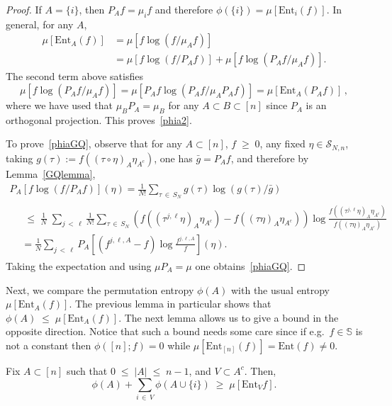 \documentclass[AHL,Unicode,longabstracts,published]{cedram}
\renewcommand{\leq}{\;\leqslant\;}
\renewcommand{\geq}{\;\geqslant\;}
\newcommand{\ent}{\mathrm{Ent}}
\newcommand{\cS}{\mathcal{S}}
\newcommand{\bbS}{\mathbb{S}}
\let\t=\tau
\begin{document}
\begin{proof}
If $A=\{i\}$, then $P_A f = \mu_i f$ and therefore $\phi(\{i\}) = \mu\left[\ent_i(f)\right]$. In general, for any $A$,
\begin{align*}
\mu\left[\ent_A(f) \right]&= \mu\left[f\log(f/\mu_Af)\right] \\
& =\mu\left[f\log(f/P_Af)\right] + \mu\left[f\log(P_Af/\mu_Af)\right].
\end{align*}
The second term above satisfies
\[
\mu\left[f\log(P_Af/\mu_Af)\right]= \mu\left[P_A f\log(P_Af/\mu_A P_Af)\right] = \mu\left[\ent_A(P_Af) \right] \,,
\]
where we have used that $\mu_BP_A=\mu_B$ for any $A\subset B\subset[n]$ since $P_A$ is an orthogonal projection. This proves~\eqref{phia2}.

To prove~\eqref{phiaGQ}, observe that for any $A\subset [n]$, $f\geq 0$, any fixed $\eta\in\cS_{N,n}$, taking $g(\t):=f((\t\circ\eta)_A\eta_{A^c})$, one has $\bar g = P_Af$, and therefore by Lemma~\ref{GQlemma},
\begin{multline*}
P_A\left[f\log(f/P_Af)\right] (\eta)=\frac1{N!}\sum_{\t\,\in\,S_N} g(\t)\log(g(\t)/\bar g)\\
\begin{aligned}
&\leq \frac1N\;\sum_{j\,<\,\ell}\frac1{N!}\sum_{\t\,\in\,S_N}\left(f\left((\t^{j,\ell}\eta)_A\eta_{A^c}\right) - f\left((\t\eta)_A\eta_{A^c}\right)\right)\log \frac{f\left((\t^{j,\ell}\eta)_A\eta_{A^c}\right)}{f\left((\t\eta)_A\eta_{A^c}\right)}
\\&=
\frac1N\sum_{j\,<\,\ell}P_A\left[\left(f^{j,\ell,A} - f\right)\log \frac{f^{j,\ell,A}}f
\right](\eta).
\end{aligned}
\end{multline*}
Taking the expectation and using $\mu P_A=\mu$ one obtains~\eqref{phiaGQ}.
\end{proof}

Next, we compare the permutation entropy $\phi(A)$ with the usual entropy $\mu[\ent_A(f) ]$. The previous lemma in particular shows that $\phi(A)\leq \mu[\ent_A(f) ]$. The next lemma allows us to give a bound in the opposite direction. Notice that such a bound needs some care since if e.g.\ $f\in\bbS$ is not a constant then $\phi([n];f)=0$ while $\mu[\ent_{[n]}(f) ]=\ent(f)\neq 0$.

\begin{lemm}\label{keyphi}
Fix $A\subset [n]$ such that $0\leq |A|\leq n-1$, and $V\subset A^c$. Then,
\begin{equation}\label{phia5}
\phi(A) + \sum_{i\,\in\,V}\phi(A\cup\{i\})\geq \mu\left[\ent_{V}f \right].
\end{equation}
\end{lemm}
\end{document}
